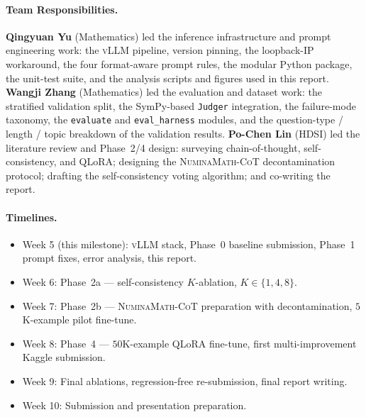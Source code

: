 \documentclass{article}
\begin{document}
\paragraph{Team Responsibilities.}
\textbf{Qingyuan Yu} (Mathematics) led the inference infrastructure
and prompt engineering work: the \textsc{vLLM} pipeline, version
pinning, the loopback-IP workaround, the four format-aware prompt
rules, the modular Python package, the unit-test suite, and the
analysis scripts and figures used in this report.
\textbf{Wangji Zhang} (Mathematics) led the evaluation and dataset
work: the stratified validation split, the SymPy-based
\texttt{Judger} integration, the failure-mode taxonomy, the
\texttt{evaluate} and \texttt{eval\_harness} modules, and the
question-type / length / topic breakdown of the validation results.
\textbf{Po-Chen Lin} (HDSI) led the literature review and Phase~2/4
design: surveying chain-of-thought, self-consistency, and QLoRA;
designing the \textsc{NuminaMath-CoT} decontamination protocol;
drafting the self-consistency voting algorithm; and co-writing the
report.

\paragraph{Timelines.}
\begin{itemize}
    \item Week 5 (this milestone): \textsc{vLLM} stack, Phase~0 baseline submission, Phase~1 prompt fixes, error analysis, this report.
    \item Week 6: Phase~2a — self-consistency $K$-ablation, $K\in\{1,4,8\}$.
    \item Week 7: Phase~2b — \textsc{NuminaMath-CoT} preparation with decontamination, $5$K-example pilot fine-tune.
    \item Week 8: Phase~4 — $50$K-example QLoRA fine-tune, first multi-improvement Kaggle submission.
    \item Week 9: Final ablations, regression-free re-submission, final report writing.
    \item Week 10: Submission and presentation preparation.
\end{itemize}
\end{document}
